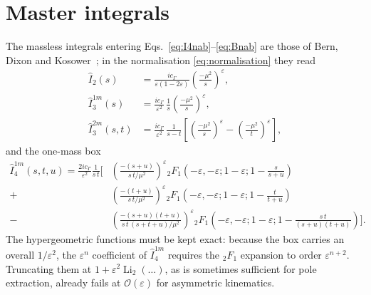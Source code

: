 \documentclass[11pt,a4paper]{article}
\newcommand{\eps}{\varepsilon}
\newcommand{\Ihat}{\hat{I}}
\newcommand{\cG}{c_\Gamma}
\DeclareMathOperator{\Li}{Li}
\begin{document}
\section{Master integrals}
\label{sec:masters}
The massless integrals entering Eqs.~\eqref{eq:I4nab}--\eqref{eq:Bnab} are those
of Bern, Dixon and Kosower~\cite{BDK,Kosower:1999rx}; in the normalisation
\eqref{eq:normalisation} they read
\begin{align}
  \Ihat_2(s)&=\frac{i\cG}{\eps(1-2\eps)}\left(\frac{-\mu^2}{s}\right)^{\!\eps},
  \label{eq:I2}\\
  \Ihat_3^{1m}(s)&=\frac{i\cG}{\eps^2}\,\frac{1}{s}\left(\frac{-\mu^2}{s}\right)^{\!\eps},
  \label{eq:I31m}\\
  \Ihat_3^{2m}(s,t)&=\frac{i\cG}{\eps^2}\,\frac{1}{s-t}
    \left[\left(\frac{-\mu^2}{s}\right)^{\!\eps}-\left(\frac{-\mu^2}{t}\right)^{\!\eps}\right],
  \label{eq:I32m}
\end{align}
and the one-mass box
\begin{equation}
\begin{split}
  \Ihat_4^{1m}(s,t,u)=\frac{2i\cG}{\eps^2}\frac{1}{s\,t}\bigg[&
   \left(\frac{-(s+u)}{s\,t/\mu^2}\right)^{\!\eps}
   {}_2F_1\!\left(-\eps,-\eps;1-\eps;1-\frac{s}{s+u}\right)\\
  +&\left(\frac{-(t+u)}{s\,t/\mu^2}\right)^{\!\eps}
   {}_2F_1\!\left(-\eps,-\eps;1-\eps;1-\frac{t}{t+u}\right)\\
  -&\left(\frac{-(s+u)(t+u)}{s\,t\,(s+t+u)/\mu^2}\right)^{\!\eps}
   {}_2F_1\!\left(-\eps,-\eps;1-\eps;1-\frac{s\,t}{(s+u)(t+u)}\right)\bigg].
\end{split}
\label{eq:I41m}
\end{equation}
The hypergeometric functions must be kept exact: because the box carries an
overall $1/\eps^2$, the $\eps^{n}$ coefficient of $\Ihat_4^{1m}$ requires the
${}_2F_1$ expansion to order $\eps^{n+2}$. Truncating them at
$1+\eps^2\Li_2(\dots)$, as is sometimes sufficient for pole extraction, already
fails at $\mathcal{O}(\eps)$ for asymmetric kinematics.
\end{document}
